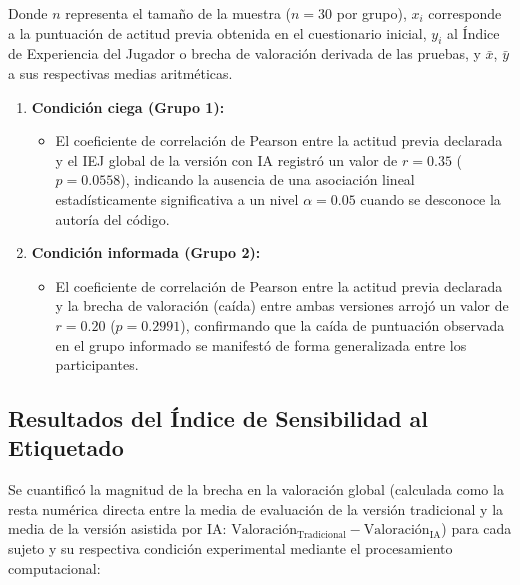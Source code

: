 Donde $n$ representa el tamaño de la muestra ($n = 30$ por grupo), $x_i$ corresponde a la puntuación de actitud previa obtenida en el cuestionario inicial, $y_i$ al Índice de Experiencia del Jugador o brecha de valoración derivada de las pruebas, y $\bar{x}$, $\bar{y}$ a sus respectivas medias aritméticas.

\begin{enumerate}
    \item \textbf{Condición ciega (Grupo 1):}
    \begin{itemize}
        \item El coeficiente de correlación de Pearson entre la actitud previa declarada y el IEJ global de la versión con IA registró un valor de $r = 0.35$ ($p = 0.0558$), indicando la ausencia de una asociación lineal estadísticamente significativa a un nivel $\alpha = 0.05$ cuando se desconoce la autoría del código.
    \end{itemize}
    \item \textbf{Condición informada (Grupo 2):}
    \begin{itemize}
        \item El coeficiente de correlación de Pearson entre la actitud previa declarada y la brecha de valoración (caída) entre ambas versiones arrojó un valor de $r = 0.20$ ($p = 0.2991$), confirmando que la caída de puntuación observada en el grupo informado se manifestó de forma generalizada entre los participantes.
    \end{itemize}
\end{enumerate}

\subsection{Resultados del Índice de Sensibilidad al Etiquetado}

Se cuantificó la magnitud de la brecha en la valoración global (calculada como la resta numérica directa entre la media de evaluación de la versión tradicional y la media de la versión asistida por IA: $\text{Valoración}_{\text{Tradicional}} - \text{Valoración}_{\text{IA}}$) para cada sujeto y su respectiva condición experimental mediante el procesamiento computacional:

